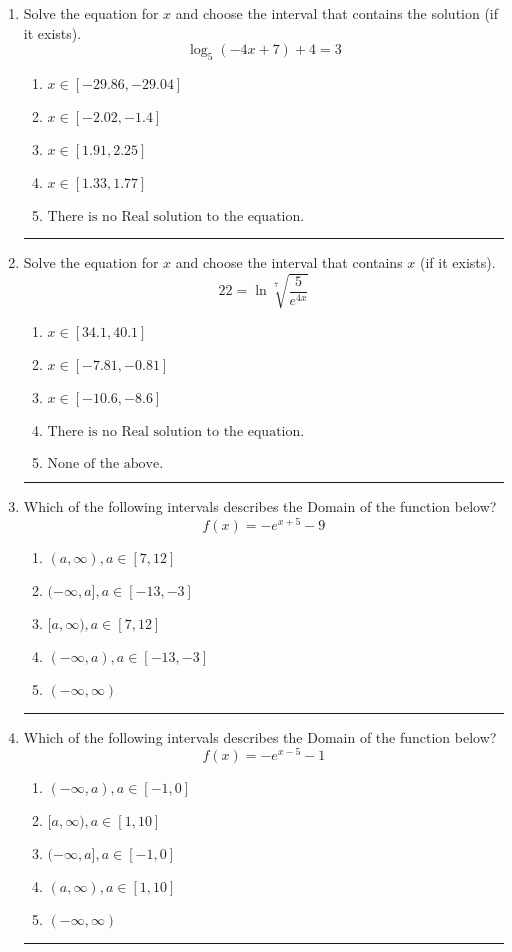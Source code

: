 \documentclass[14pt]{extbook}
\newcommand{\litem}[1]{\item#1\hspace*{-1cm}\rule{\textwidth}{0.4pt}}
\begin{document}
\begin{enumerate}
\litem{
Solve the equation for $x$ and choose the interval that contains the solution (if it exists).\[ \log_{5}{(-4x+7)}+4 = 3 \]\begin{enumerate}[label=\Alph*.]
\item \( x \in [-29.86, -29.04] \)
\item \( x \in [-2.02, -1.4] \)
\item \( x \in [1.91, 2.25] \)
\item \( x \in [1.33, 1.77] \)
\item \( \text{There is no Real solution to the equation.} \)

\end{enumerate} }
\litem{
 Solve the equation for $x$ and choose the interval that contains $x$ (if it exists).\[  22 = \ln{\sqrt[7]{\frac{5}{e^{4x}}}} \]\begin{enumerate}[label=\Alph*.]
\item \( x \in [34.1, 40.1] \)
\item \( x \in [-7.81, -0.81] \)
\item \( x \in [-10.6, -8.6] \)
\item \( \text{There is no Real solution to the equation.} \)
\item \( \text{None of the above.} \)

\end{enumerate} }
\litem{
Which of the following intervals describes the Domain of the function below?\[ f(x) = -e^{x+5}-9 \]\begin{enumerate}[label=\Alph*.]
\item \( (a, \infty), a \in [7, 12] \)
\item \( (-\infty, a], a \in [-13, -3] \)
\item \( [a, \infty), a \in [7, 12] \)
\item \( (-\infty, a), a \in [-13, -3] \)
\item \( (-\infty, \infty) \)

\end{enumerate} }
\litem{
Which of the following intervals describes the Domain of the function below?\[ f(x) = -e^{x-5}-1 \]\begin{enumerate}[label=\Alph*.]
\item \( (-\infty, a), a \in [-1, 0] \)
\item \( [a, \infty), a \in [1, 10] \)
\item \( (-\infty, a], a \in [-1, 0] \)
\item \( (a, \infty), a \in [1, 10] \)
\item \( (-\infty, \infty) \)


\end{enumerate}}
\end{enumerate}
\end{document}
